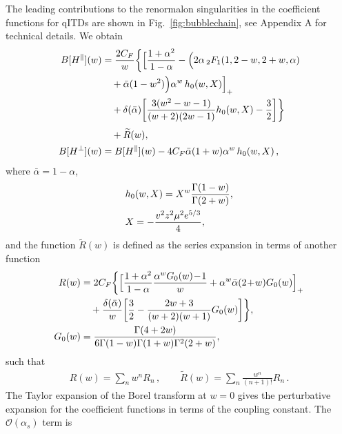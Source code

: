 \documentclass[aps,prd,twocolumn,a4paper,superscriptaddress,10pt,showpacs,notitlepage,floatfix]{revtex4-1}
\begin{document}
The leading contributions to the renormalon singularities in the coefficient functions for qITDs are shown in Fig.~\ref{fig:bubblechain},
see Appendix A for technical details. We obtain   
\begin{align}
\label{B[H]}
B[H^\parallel](w)&=\frac{2C_F}{w} \biggl\{\Big[\frac{1+\alpha^2}{1-\alpha}
- \Big(2\alpha\,{}_2F_1(1,2-w,2+w,\alpha)
\notag\\&\quad
 +\bar \alpha (1-w^2)\Big)\alpha^w\,h_0(w,X)\Big]_+
\notag\\ &\quad
+\delta(\bar \alpha)\bigg[\frac{3(w^2-w-1)}{(w+2)(2w-1)}h_0(w,X)-\frac{3}{2}\bigg]\biggr\}
\notag\\[1mm] &\quad
+\widetilde{R}(w),
\\
B[H^\perp](w)&= B[H^\parallel](w)-4C_F \bar \alpha(1+w)\alpha^w\,h_0(w,X)\,,
\end{align}
where $\bar\alpha = 1-\alpha$,
\begin{align}
& h_0(w,X)=X^w \frac{\Gamma(1-w)}{\Gamma(2+w)},
\notag\\
&X=- \frac{v^2 z^2 \mu^2 e^{5/3}}{4},
\end{align}
and the function $\widetilde{R}(w)$ is defined as the series expansion in terms of another function
\begin{align}
R(w)&=2C_F \biggl\{\Big[\frac{1+\alpha^2}{1-\alpha}\frac{\alpha^wG_0(w)\!-\!1}{w}+\alpha^w \bar \alpha (2\!+\!w)G_0(w)\Big]_+
\notag\\&\quad
+\frac{\delta(\bar \alpha)}{w}\bigg[\frac{3}{2}-\frac{2w+3}{(w+2)(w+1)}G_0(w)\bigg]\biggr\},
\notag\\
G_0(w)&=\frac{\Gamma(4+2w)}{6\Gamma(1-w)\Gamma(1+w)\Gamma^2(2+w)},
\end{align}
such that
\begin{align}
  R(w) = \sum_n w^n R_n\,, \qquad \widetilde{R}(w) = \sum_n \frac{w^n}{(n+1)!} R_n \,.
\end{align}
The Taylor expansion of the Borel transform at $w=0$ gives the perturbative expansion for the coefficient functions in terms of the coupling constant. 
The $\mathcal{O}(\alpha_s)$ term is
\end{document}
